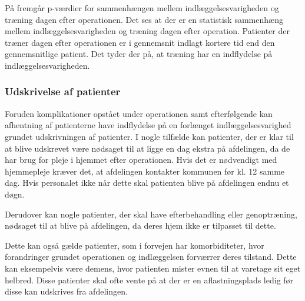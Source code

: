 \noindent 
På  fremgår p-værdier for sammenhængen mellem indlæggelsesvarigheden og træning dagen efter operationen. Det ses at der er en statistisk sammenhæng mellem indlæggelsesvarigheden og træning dagen efter operation. Patienter der træner dagen efter operationen er i gennemsnit indlagt kortere tid end den gennemsnitlige patient. Det tyder der på, at træning har en indflydelse på indlæggelsesvarigheden. 


\subsubsection{Udskrivelse af patienter}
Foruden komplikationer opstået under operationen samt efterfølgende kan afhentning af patienterne have indflydelse på en forlænget indlæggelsesvarighed grundet udskrivningen af patienter. I nogle tilfælde kan patienter, der er klar til at blive udskrevet være nødsaget til at ligge en dag ekstra på afdelingen, da de har brug for pleje i hjemmet efter operationen. Hvis det er nødvendigt med hjemmepleje kræver det, at afdelingen kontakter kommunen før kl. 12 samme dag. Hvis personalet ikke når dette skal patienten blive på afdelingen endnu et døgn. 

Derudover kan nogle patienter, der skal have efterbehandling eller genoptræning,  nødsaget til at blive på afdelingen, da deres hjem ikke er tilpasset til dette. 

Dette kan også gælde patienter, som i forvejen har komorbiditeter, hvor forandringer grundet operationen og indlæggelsen forværrer deres tilstand. Dette kan eksempelvis være demens, hvor patienten mister evnen til at varetage sit eget helbred. Disse patienter skal ofte vente på at der er en aflastningsplads ledig før disse kan udskrives fra afdelingen. 


